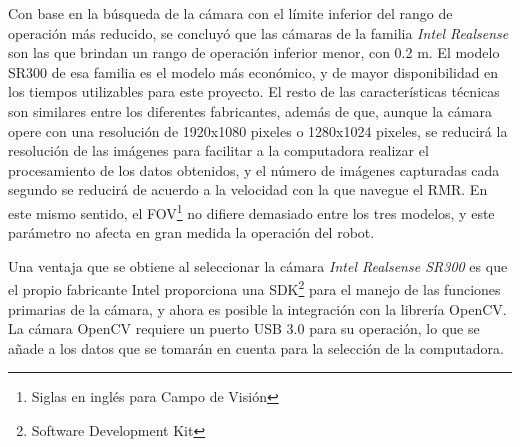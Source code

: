 \par Con base en la búsqueda de la cámara con el límite inferior del rango de operación más reducido, se concluyó que las cámaras de la familia {\it Intel Realsense} son las que brindan un rango de operación inferior menor, con 0.2 m. El modelo SR300 de esa familia es el modelo más económico, y de mayor disponibilidad en los tiempos utilizables para este proyecto. El resto de las características técnicas son similares entre los diferentes fabricantes, además de que, aunque la cámara opere con una resolución de 1920x1080 pixeles o 1280x1024 pixeles, se reducirá la resolución de las imágenes para facilitar a la computadora realizar el procesamiento de los datos obtenidos, y el número de imágenes capturadas cada segundo se reducirá de acuerdo a la velocidad con la que navegue el RMR. En este mismo sentido, el FOV\footnote{Siglas en inglés para Campo de Visión} no difiere demasiado entre los tres modelos, y este parámetro no afecta en gran medida la operación del robot.
\par Una ventaja que se obtiene al seleccionar la cámara {\it Intel Realsense SR300} es que el propio fabricante Intel proporciona una SDK\footnote{Software Development Kit} para el manejo de las funciones primarias de la cámara, y ahora es posible la integración con la librería OpenCV. La cámara OpenCV requiere un puerto USB 3.0 para su operación, lo que se añade a los datos que se tomarán en cuenta para la selección de la computadora.
